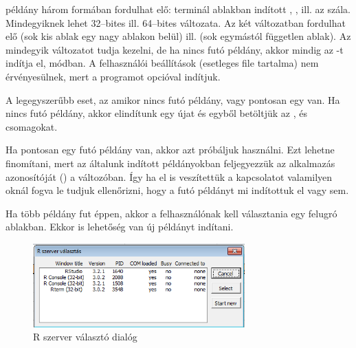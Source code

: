  példány három formában fordulhat elő: terminál ablakban indított , , ill. az 
 szála. Mindegyiknek lehet 32–bites ill. 64–bites
változata. 
Az  két változatban
fordulhat elő  (sok kis ablak egy nagy ablakon belül)
ill.  (sok egymástól független ablak). Az 
mindegyik változatot tudja kezelni, de ha nincs futó példány, akkor
mindig az -t indítja el,  módban. A felhasználói beállítások (esetleges  file tartalma)
nem érvényesülnek, mert a programot  opcióval
indítjuk.

A legegyszerűbb eset, az amikor nincs futó  példány, vagy
pontosan egy van. Ha nincs 
futó  példány, akkor elindítunk egy újat és egyből betöltjük
az ,  és  csomagokat.

Ha pontosan egy futó  példány van, akkor azt próbáljuk
használni. Ezt lehetne finomítani, mert az általunk indított 
példányokban feljegyezzük az  alkalmazás azonosítóját 
() a  változóban. Így ha el is
veszítettük a kapcsolatot valamilyen 
oknál fogva le tudjuk ellenőrizni, hogy a futó  példányt mi
indítottuk el vagy sem. 

Ha több  példány fut éppen, akkor a felhasználónak kell
választania egy felugró ablakban. Ekkor is lehetőség van új példányt
indítani. 
\begin{figure}[h]
  \centering
  \includegraphics[width=22em]{images/rselect}
  \caption{R szerver választó dialóg}
  \label{fig:3.3}
\end{figure}

